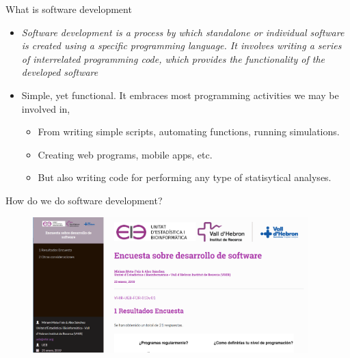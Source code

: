 \documentclass[ignorenonframetext,]{beamer}
\providecommand{\tightlist}{%
  \setlength{\itemsep}{0pt}\setlength{\parskip}{0pt}}
\begin{document}
\begin{frame}{%
\protect\hypertarget{what-is-software-development}{%
What is software development}}

\begin{itemize}
\item
  \emph{Software development is a process by which standalone or
  individual software is created using a specific programming language.
  It involves writing a series of interrelated programming code, which
  provides the functionality of the developed software}
\item
  Simple, yet functional. It embraces most programming activities we may
  be involved in,

  \begin{itemize}
  \tightlist
  \item
    From writing simple scripts, automating functions, running
    simulations.
  \item
    Creating web programs, mobile apps, etc.
  \item
    But also writing code for performing any type of statisytical
    analyses.
  \end{itemize}
\end{itemize}

\end{frame}

\begin{frame}{%
\protect\hypertarget{how-do-we-do-software-development}{%
How do we do software development?}}

\begin{figure}
\includegraphics[width=0.95\textwidth]{"images/programmingSurvey"}
\end{figure}

\end{frame}
\end{document}
